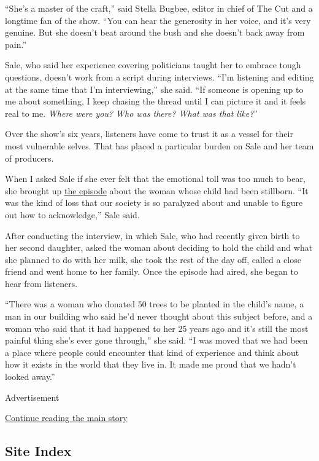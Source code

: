 ``She's a master of the craft,'' said Stella Bugbee, editor in chief of
The Cut and a longtime fan of the show. ``You can hear the generosity in
her voice, and it's very genuine. But she doesn't beat around the bush
and she doesn't back away from pain.''

Sale, who said her experience covering politicians taught her to embrace
tough questions, doesn't work from a script during interviews. ``I'm
listening and editing at the same time that I'm interviewing,'' she
said. ``If someone is opening up to me about something, I keep chasing
the thread until I can picture it and it feels real to me. \emph{Where
were you? Who was there? What was that like?}''

Over the show's six years, listeners have come to trust it as a vessel
for their most vulnerable selves. That has placed a particular burden on
Sale and her team of producers.

When I asked Sale if she ever felt that the emotional toll was too much
to bear, she brought up
\href{https://www.wnycstudios.org/podcasts/deathsexmoney/episodes/stillbirth-death-sex-money}{the
episode} about the woman whose child had been stillborn. ``It was the
kind of loss that our society is so paralyzed about and unable to figure
out how to acknowledge,'' Sale said.

After conducting the interview, in which Sale, who had recently given
birth to her second daughter, asked the woman about deciding to hold the
child and what she planned to do with her milk, she took the rest of the
day off, called a close friend and went home to her family. Once the
episode had aired, she began to hear from listeners.

``There was a woman who donated 50 trees to be planted in the child's
name, a man in our building who said he'd never thought about this
subject before, and a woman who said that it had happened to her 25
years ago and it's still the most painful thing she's ever gone
through,'' she said. ``I was moved that we had been a place where people
could encounter that kind of experience and think about how it exists in
the world that they live in. It made me proud that we hadn't looked
away.''

Advertisement

\protect\hyperlink{after-bottom}{Continue reading the main story}

\hypertarget{site-index}{%
\subsection{Site Index}\label{site-index}}

